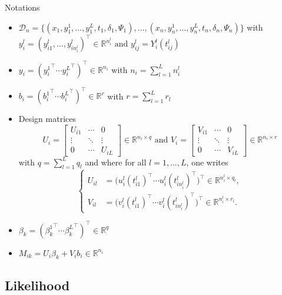 \documentclass{beamer}
\newcommand{\R}{\mathbb R}
\newcommand{\cD}{\mathcal D}
\begin{document}
\begin{frame}{Notations}

\footnotesize
\begin{itemize}
  \item<1-> $\cD_n = \big\{ (x_1, y_1^1, \ldots, y_1^L, t_1, \delta_1, \Psi_1), \ldots, (x_n, y_n^1, \ldots, y_n^L, t_n, \delta_n, \Psi_n) \big\}$ with $y_i^l=(y_{i1}^l, \ldots, y_{in_i^l}^l)^\top \in \R^{n_i^l} \text{ and } y_{ij}^l=Y_i^l(t_{ij}^l)$
  \item<2-> $y_i = ({y_i^1}^\top \cdots {y_i^L}^\top)^\top \in \R^{n_i}$ with $n_i = \sum_{l=1}^L n_i^l$
  \item<3-> $b_i = ({b_i^1}^\top \cdots {b_i^L}^\top)^\top \in \R^r$ with $r = \sum_{l=1}^L r_l$
  \item<4-> Design matrices
  \[ U_i = 
\begin{bmatrix}
  U_{i1} & \cdots & 0\\
  \vdots &  \ddots & \vdots \\
  0 & \cdots & U_{iL}
\end{bmatrix} 
\in \R^{n_i \times q}
\text{ and }
V_i = 
\begin{bmatrix}
  V_{i1} & \cdots & 0\\
  \vdots &  \ddots & \vdots \\
  0 & \cdots & V_{iL}
\end{bmatrix}
\in \R^{n_i \times r}
\]
with $q = \sum_{l=1}^L q_l$ and where for all $l=1, \ldots, L$, one writes
\[
\left\{
    \begin{array}{ll}
        U_{il} &= \big(u_i^l(t_{i1}^l)^\top \cdots u_i^l(t_{in_i^l}^l)^\top\big)^\top \in \R^{n_i^l \times q_l},\\
        V_{il} &= \big(v_i^l(t_{i1}^l)^\top \cdots v_i^l(t_{in_i^l}^l)^\top\big)^\top \in \R^{n_i^l \times r_l}.
    \end{array}
\right.
\]
  \item<5-> $\beta_k = ({\beta_k^1}^\top \cdots {\beta_k^L}^\top)^\top \in \R^q$
  \item<6-> $M_{ik} = U_i\beta_k + V_ib_i \in \R^{n_i}$
\end{itemize}

\end{frame}

\subsection{Likelihood}
\end{document}
